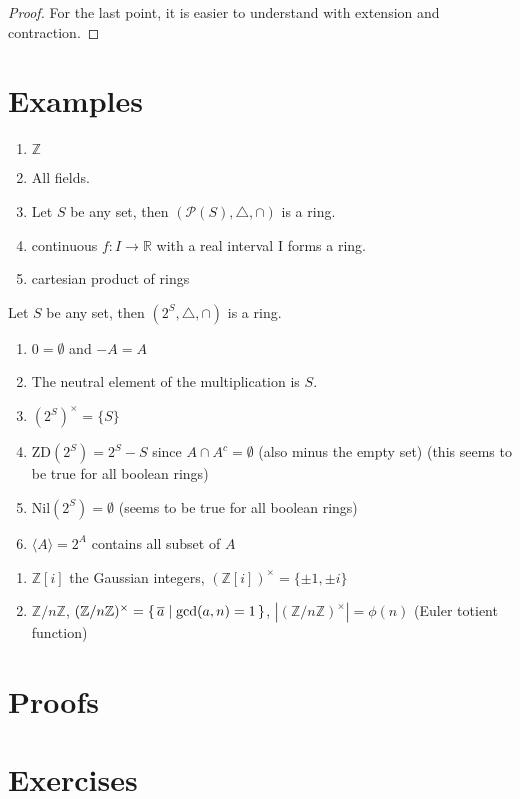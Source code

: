 \begin{proof}
    For the last point, it is easier to understand with extension and contraction.
\end{proof}

\section{Examples}

\begin{exmp}
    \begin{enumerate}
        \item \(\mathbb{Z}\)
        \item All fields.
        \item Let \(S\) be any set, then \((\mathcal{P}(S), \triangle, \cap)\) is a ring.
        \item continuous \(f: I \longrightarrow \mathbb{R}\) with a real interval I forms a ring.
        \item cartesian product of rings
    \end{enumerate}
\end{exmp}

\begin{exmp}
    Let \(S\) be any set, then \((2^S, \triangle, \cap)\) is a ring.
    \begin{enumerate}
        \item \(0 = \emptyset\) and \(-A = A\)
        \item The neutral element of the multiplication is \(S\).
        \item \((2^S)^\times = \{S\}\)
        \item \(\mathrm{ZD}(2^S) = 2^S - S\) since \(A \cap A^c = \emptyset\) (also minus the empty set) (this seems to be true for all boolean rings)
        \item \(\mathrm{Nil}(2^S) = \emptyset\) (seems to be true for all boolean rings)
        \item \(\langle A \rangle = 2^A\) contains all subset of \(A\)
    \end{enumerate}
\end{exmp}

\begin{exmp}
    \begin{enumerate}
        \item \(\mathbb{Z}[i]\) the Gaussian integers, \((\mathbb{Z}[i])^\times = {\{\pm 1, \pm i\}}\)
        \item \(\mathbb{Z}/n\mathbb{Z}\), \((\mathbb{Z}/n\mathbb{Z})^\times = \left\{\, \overline{a} \mathrel{\mid} \mathrm{gcd}(a, n)=1 \,\right\}\), \(|(\mathbb{Z}/n\mathbb{Z})^\times| = \phi(n)\) (Euler totient function)
    \end{enumerate}
\end{exmp}

\section{Proofs}

\section{Exercises}